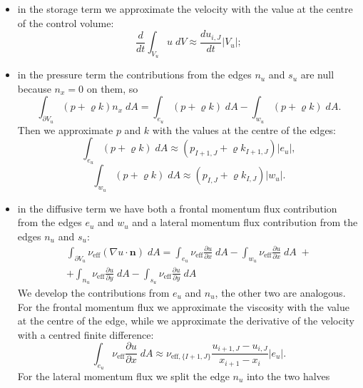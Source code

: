 \begin{itemize}
	\item in the storage term we approximate the velocity with the value at the 
	centre of the control volume:
	\begin{equation}
	\frac{d}{dt} \int_{V_u}  u\; dV \approx \frac{du_{i,J}}{dt}|V_u|;
	\end{equation}
	\item in the pressure term the contributions from the edges $n_u$ and $s_u$ 
	are null because $n_x=0$ on them, so 
	\begin{equation}
	\int_{\partial V_u} (p + \varrho k)n_x \; dA = \int_{e_u} (p+\varrho k) \; 
	dA - \int_{w_u} (p+\varrho k) \; dA.
	\end{equation}
	Then we approximate $p$ and $k$ with the values at the centre of the edges:
	\begin{equation}
	\int_{e_u} (p+\varrho k) \; dA \approx (p_{I+1,J} +\varrho k_{I+1,J}) |e_u|,
	\end{equation}
	\begin{equation}
	\int_{w_u} (p+\varrho k) \; dA \approx (p_{I,J} +\varrho k_{I,J}) |w_u|.
	\end{equation}
	\item in the diffusive term we have both a frontal momentum flux 
	contribution from the edges $e_u$ and $w_u$ and a lateral momentum flux 
	contribution from the edges $n_u$ and $s_u$:
	\begin{multline}
	\int_{\partial V_u} \nu_\text{eff} (\nabla u \cdot \mathbf{n}) \; dA =     
	\int_{e_u} \nu_\text{eff} \frac{\partial u}{\partial x} \; dA
	- \int_{w_u} \nu_\text{eff} \frac{\partial u}{\partial x} \; dA \;+\\
	+\int_{n_u} \nu_\text{eff} \frac{\partial u}{\partial y} \; dA
	- \int_{s_u} \nu_\text{eff} \frac{\partial u}{\partial y} \; dA
	\end{multline}
	We develop the contributions from $e_u$ and $n_u$, the other two are 
	analogous.\\	
	For the frontal momentum flux we approximate the viscosity with 
	the value at the centre of the edge, while we approximate the derivative of 
	the velocity with a centred finite difference:
	\begin{equation}
	\int_{e_u} \nu_\text{eff} \frac{\partial u}{\partial x} \; dA \approx 
	\nu_{\text{eff},\{I+1,J\}} \frac{u_{i+1,J} - u_{i,J}}{x_{i+1}-x_i} |e_u|.
	\end{equation}
	For the lateral momentum flux we split the 	edge $n_u$ into the two halves 

\end{itemize}
